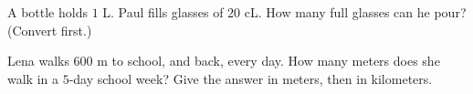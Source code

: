 \begin{exercise}[$\star\star$]\label{exo:g3:measure:10}
A bottle holds $1$ L. Paul fills glasses of $20$ cL. How many full
glasses can he pour? (Convert first.)
\end{exercise}

\begin{exercise}[$\star\star$]\label{exo:g3:measure:11}
Lena walks $600$ m to school, and back, every day. How many meters
does she walk in a $5$-day school week? Give the answer in meters,
then in kilometers.
\end{exercise}
